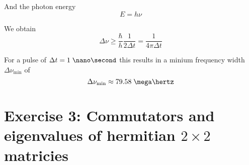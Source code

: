 \documentclass[a4paper,german,12pt,smallheadings]{scrartcl}
\begin{document}
\begin{enumerate}[a)]
    And the photon energy
    \begin{equation*}
      E = h \nu
    \end{equation*}

    We obtain
    \begin{equation*}
      \Delta \nu \ge \frac{\hbar}{h} \frac{1}{2 \Delta t} = \frac{1}{4 \pi \Delta t}
    \end{equation*}

    For a pulse of $\Delta t = 1 \; \nano\second$ this results in a minium frequency width $\Delta \nu_\text{min}$ of
    \begin{equation*}
      \Delta \nu_\text{min} \approx 79.58 \; \mega\hertz
    \end{equation*}
\end{enumerate}
\section*{Exercise 3: Commutators and eigenvalues of hermitian $2 \times 2$ matricies}
\end{document}
